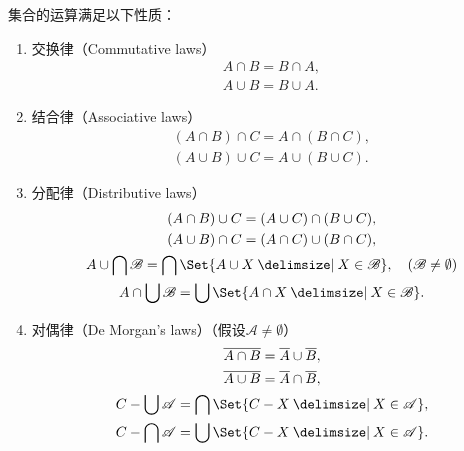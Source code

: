 \begin{property}
集合的运算满足以下性质：
\begin{enumerate}
\item 交换律（{\rm Commutative laws}）
\begin{gather}
A \cap B = B \cap A, \label{equation:集合论.集合代数公式1} \\
A \cup B = B \cup A. \label{equation:集合论.集合代数公式2}
\end{gather}

\item 结合律（{\rm Associative laws}）
\begin{gather}
(A \cap B) \cap C = A \cap (B \cap C), \label{equation:集合论.集合代数公式3} \\
(A \cup B) \cup C = A \cup (B \cup C). \label{equation:集合论.集合代数公式4}
\end{gather}

\item 分配律（{\rm Distributive laws}）
\begin{gather}
(A \cap B) \cup C = (A \cup C) \cap (B \cup C), \label{equation:集合论.集合代数公式5} \\
(A \cup B) \cap C = (A \cap C) \cup (B \cap C), \label{equation:集合论.集合代数公式6} \\
A \cup \bigcap \mathscr{B} = \bigcap\Set{A \cup X \given X \in \mathscr{B}}, \quad(\mathscr{B}\neq\emptyset) \label{equation:集合论.集合代数公式5'} \\
A \cap \bigcup \mathscr{B} = \bigcup\Set{A \cap X \given X \in \mathscr{B}}. \label{equation:集合论.集合代数公式6'}
\end{gather}

\item 对偶律（{\rm De Morgan's laws}）（假设\(\mathscr{A}\neq\emptyset\)）
\begin{gather}
\overline{A \cap B} = \overline A \cup \overline B, \label{equation:集合论.集合代数公式7} \\
\overline{A \cup B} = \overline A \cap \overline B, \label{equation:集合论.集合代数公式8} \\
C - \bigcup\mathscr{A} = \bigcap\Set{C-X \given X\in\mathscr{A}}, \label{equation:集合论.集合代数公式7'} \\
C - \bigcap\mathscr{A} = \bigcup\Set{C-X \given X\in\mathscr{A}}. \label{equation:集合论.集合代数公式8'}
\end{gather}


\end{enumerate}
\end{property}
